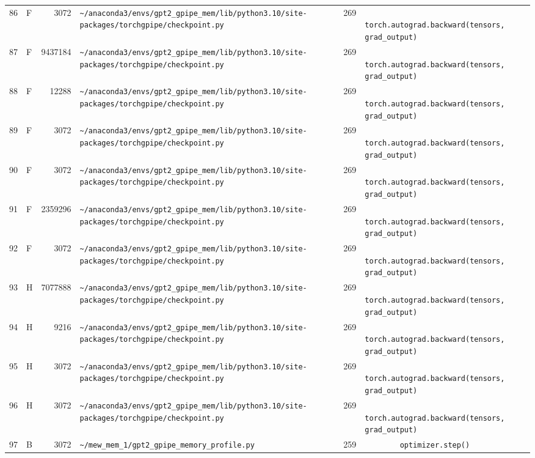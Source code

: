 \documentclass{article}
\begin{document}
\begin{longtable}{r l r p{6.5cm} r p{7.0cm}}
86 & F & 3072 & \lstinline|~/anaconda3/envs/gpt2_gpipe_mem/lib/python3.10/site-packages/torchgpipe/checkpoint.py| & 269 & \lstinline|            torch.autograd.backward(tensors, grad_output)| \\
87 & F & 9437184 & \lstinline|~/anaconda3/envs/gpt2_gpipe_mem/lib/python3.10/site-packages/torchgpipe/checkpoint.py| & 269 & \lstinline|            torch.autograd.backward(tensors, grad_output)| \\
88 & F & 12288 & \lstinline|~/anaconda3/envs/gpt2_gpipe_mem/lib/python3.10/site-packages/torchgpipe/checkpoint.py| & 269 & \lstinline|            torch.autograd.backward(tensors, grad_output)| \\
89 & F & 3072 & \lstinline|~/anaconda3/envs/gpt2_gpipe_mem/lib/python3.10/site-packages/torchgpipe/checkpoint.py| & 269 & \lstinline|            torch.autograd.backward(tensors, grad_output)| \\
90 & F & 3072 & \lstinline|~/anaconda3/envs/gpt2_gpipe_mem/lib/python3.10/site-packages/torchgpipe/checkpoint.py| & 269 & \lstinline|            torch.autograd.backward(tensors, grad_output)| \\
91 & F & 2359296 & \lstinline|~/anaconda3/envs/gpt2_gpipe_mem/lib/python3.10/site-packages/torchgpipe/checkpoint.py| & 269 & \lstinline|            torch.autograd.backward(tensors, grad_output)| \\
92 & F & 3072 & \lstinline|~/anaconda3/envs/gpt2_gpipe_mem/lib/python3.10/site-packages/torchgpipe/checkpoint.py| & 269 & \lstinline|            torch.autograd.backward(tensors, grad_output)| \\
93 & H & 7077888 & \lstinline|~/anaconda3/envs/gpt2_gpipe_mem/lib/python3.10/site-packages/torchgpipe/checkpoint.py| & 269 & \lstinline|            torch.autograd.backward(tensors, grad_output)| \\
94 & H & 9216 & \lstinline|~/anaconda3/envs/gpt2_gpipe_mem/lib/python3.10/site-packages/torchgpipe/checkpoint.py| & 269 & \lstinline|            torch.autograd.backward(tensors, grad_output)| \\
95 & H & 3072 & \lstinline|~/anaconda3/envs/gpt2_gpipe_mem/lib/python3.10/site-packages/torchgpipe/checkpoint.py| & 269 & \lstinline|            torch.autograd.backward(tensors, grad_output)| \\
96 & H & 3072 & \lstinline|~/anaconda3/envs/gpt2_gpipe_mem/lib/python3.10/site-packages/torchgpipe/checkpoint.py| & 269 & \lstinline|            torch.autograd.backward(tensors, grad_output)| \\
97 & B & 3072 & \lstinline|~/mew_mem_1/gpt2_gpipe_memory_profile.py| & 259 & \lstinline|        optimizer.step()| \\

\end{longtable}
\end{document}
